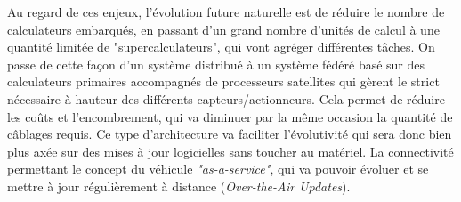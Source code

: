 \documentclass[french, a4paper, 11pt, twoside, pdftex]{StyleThese}
\begin{document}
	 	Au regard de ces enjeux, l'évolution future naturelle est de réduire le nombre de calculateurs embarqués, en passant d'un grand nombre d'unités de calcul à une quantité limitée de "supercalculateurs", qui vont agréger différentes tâches. On passe de cette façon d'un système distribué à un système fédéré basé sur des calculateurs primaires accompagnés de processeurs satellites qui gèrent le strict nécessaire à hauteur des différents capteurs/actionneurs.  Cela permet de réduire les coûts et l'encombrement, qui va diminuer par la même occasion la quantité de câblages requis. Ce type d'architecture va faciliter l'évolutivité qui sera donc bien plus axée sur des mises à jour logicielles sans toucher au matériel. La connectivité permettant le concept du véhicule \textit{"as-a-service"}, qui va pouvoir évoluer et se mettre à jour régulièrement à distance (\textit{Over-the-Air Updates}). 

%		
		
\end{document}
